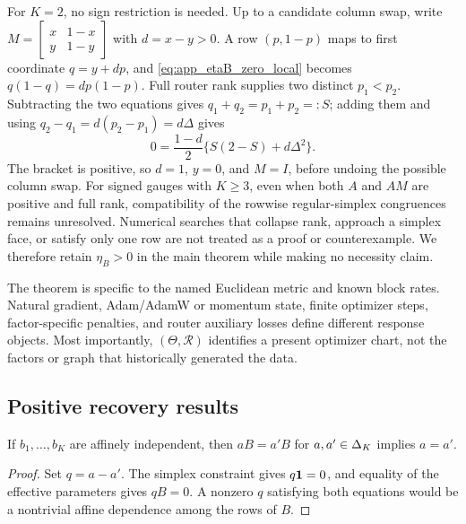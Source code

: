 For \(K=2\), no sign restriction is needed.  Up to a candidate column swap,
write
\(M=\left[\begin{smallmatrix}x&1-x\\y&1-y\end{smallmatrix}\right]\)
with \(d=x-y>0\).  A row \((p,1-p)\) maps to first coordinate
\(q=y+dp\), and \eqref{eq:app_etaB_zero_local} becomes
\(q(1-q)=d p(1-p)\).  Full router rank supplies two distinct
\(p_1<p_2\).  Subtracting the two equations gives
\(q_1+q_2=p_1+p_2=:S\); adding them and using
\(q_2-q_1=d(p_2-p_1)=d\Delta\) gives
\[
 0=\frac{1-d}{2}\{S(2-S)+d\Delta^2\}.
\]
The bracket is positive, so \(d=1\), \(y=0\), and \(M=I\), before undoing
the possible column swap.  For signed gauges with \(K\ge3\), even when both
\(A\) and \(AM\) are positive and full rank, compatibility of the rowwise
regular-simplex congruences remains unresolved.  Numerical searches that
collapse rank, approach a simplex face, or satisfy only one row are not
treated as a proof or counterexample.  We therefore retain \(\eta_B>0\) in
the main theorem while making no necessity claim.

The theorem is specific to the named Euclidean metric and known block rates.
Natural gradient, Adam/AdamW or momentum state, finite optimizer steps,
factor-specific penalties, and router auxiliary losses define different
response objects.  Most importantly, \((\Theta,\mathcal R)\) identifies a
present optimizer chart, not the factors or graph that historically generated
the data.

\subsection{Positive recovery results}
\label{app:positive_proofs}

\begin{lemma}
\label{lem:app_barycentric}
If $b_1,\ldots,b_K$ are affinely independent, then
$aB=a'B$ for $a,a'\in\Delta_K$ implies $a=a'$.
\end{lemma}

\begin{proof}
Set $q=a-a'$.  The simplex constraint gives $q\mathbf{1}=0$, and equality of the
effective parameters gives $qB=0$.  A nonzero $q$ satisfying both equations
would be a nontrivial affine dependence among the rows of $B$.
\end{proof}

